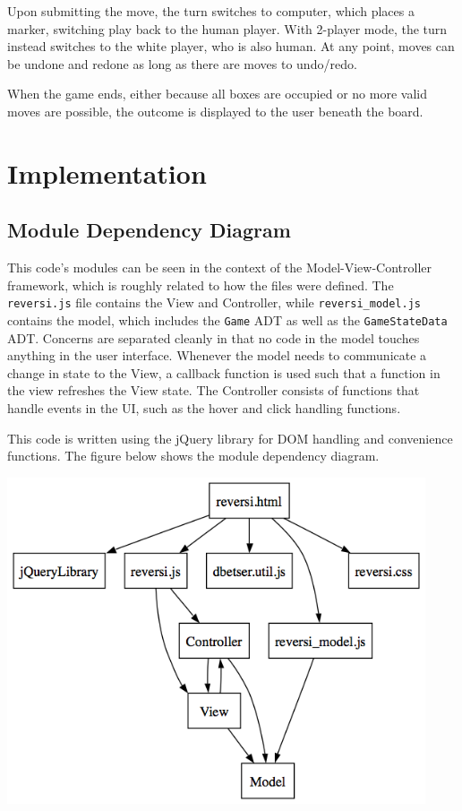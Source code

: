 \documentclass[11pt,letterpaper]{article}
\begin{document}
Upon submitting the move, the turn switches to computer, which places a marker, switching play back to the human player. With 2-player mode, the turn instead switches to the white player, who is also human. At any point, moves can be undone and redone as long as there are moves to undo/redo.

When the game ends, either because all boxes are occupied or no more valid moves are possible, the outcome is displayed to the user beneath the board.

\section{Implementation}

\subsection{Module Dependency Diagram}
This code's modules can be seen in the context of the Model-View-Controller framework, which is roughly related to how the files were defined. The \texttt{reversi.js} file contains the View and Controller, while \texttt{reversi\_model.js} contains the model, which includes the \texttt{Game} ADT as well as the \texttt{GameStateData} ADT. Concerns are separated cleanly in that no code in the model touches anything in the user interface. Whenever the model needs to communicate a change in state to the View, a callback function is used such that a function in the view refreshes the View state. The Controller consists of functions that handle events in the UI, such as the hover and click handling functions. 

This code is written using the jQuery library for DOM handling and convenience functions. The figure below shows the module dependency diagram.

\begin{center}
\includegraphics[width=350pt]{dot/moddepdiagram.png}
\label{fig:ob2} 
\end{center}
\end{document}
